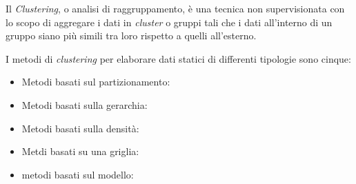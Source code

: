 Il \textit{Clustering}, o analisi di raggruppamento, è una tecnica non supervisionata con lo scopo di aggregare i dati in \textit{cluster} o gruppi
tali che i dati all'interno di un gruppo siano più simili tra loro rispetto a quelli all'esterno\cite{liao2005clustering, zazzarro2009clustering}.

I metodi di \textit{clustering} per elaborare dati statici di differenti tipologie sono cinque:

\begin{itemize}
  \item Metodi basati sul partizionamento:
  \item Metodi basati sulla gerarchia:
  \item Metodi basati sulla densità:
  \item Metdi basati su una griglia:
  \item metodi basati sul modello:
\end{itemize}


